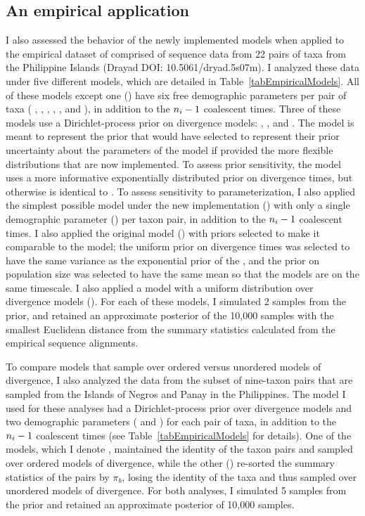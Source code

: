 \subsection{An empirical application}
I also assessed the behavior of the newly implemented models when applied to
the empirical dataset of \citet{Oaks2012} comprised of sequence data from 22
pairs of taxa from the Philippine Islands (Drayad DOI: 10.5061/dryad.5s07m).
I analyzed these data under five different models, which are detailed in
Table~\ref{tabEmpiricalModels}.
All of these models except one (\empModelDPPSimple) have six free demographic
parameters per pair of taxa (
\ancestralTheta{},
,
,
\bottleTime{},
, and
),
in addition to the $\popSampleSize{i}{} - 1$ coalescent times.
Three of these models use a Dirichlet-process prior on divergence models:
\empModelDPP, \empModelDPPInform, and \empModelDPPSimple.
The \empModelDPP model is meant to represent the prior that \citet{Oaks2012}
would have selected to represent their prior uncertainty about the parameters
of the model if provided the more flexible distributions that are now
implemented.
To assess prior sensitivity, the \empModelDPPInform model uses a more
informative exponentially distributed prior on divergence times, but otherwise
is identical to \empModelDPP.
To assess sensitivity to parameterization, I also applied the simplest
possible model under the new implementation (\empModelDPPSimple) with only a
single demographic parameter (\myTheta{}) per taxon pair, in addition to the
$\popSampleSize{i}{} - 1$ coalescent times.
I also applied the original \msb model (\empModelOld) with priors
selected to make it comparable to the \empModelDPP model;
the uniform prior on divergence times was selected to have the same variance as
the exponential prior of the \empModelDPP, and the prior on population
size was selected to have the same mean so that the models are on the same
timescale.
I also applied a model with a uniform distribution over divergence models
(\empModelUniform).
For each of these models, I simulated 2 samples from the prior, and
retained an approximate posterior of the 10,000 samples with the smallest
Euclidean distance from the summary statistics calculated from the empirical
sequence alignments.

To compare models that sample over ordered versus unordered models of
divergence, I also analyzed the data from the subset of nine-taxon pairs that
are sampled from the Islands of Negros and Panay in the Philippines.
The model I used for these analyses had a Dirichlet-process prior over
divergence models and two demographic parameters (\ancestralTheta{} and
\descendantTheta{}{}) for each pair of taxa, in addition to the
$\popSampleSize{i}{} - 1$ coalescent times (see Table~\ref{tabEmpiricalModels}
for details).
One of the models, which I denote \npModelDPPOrdered, maintained the identity
of the taxon pairs and sampled over ordered models of divergence, while the
other (\npModelDPP) re-sorted the summary statistics of the pairs by $\pi_b$,
losing the identity of the taxa and thus sampled over unordered models of
divergence.
For both analyses, I simulated 5 samples from the prior and retained an
approximate posterior of 10,000 samples.

